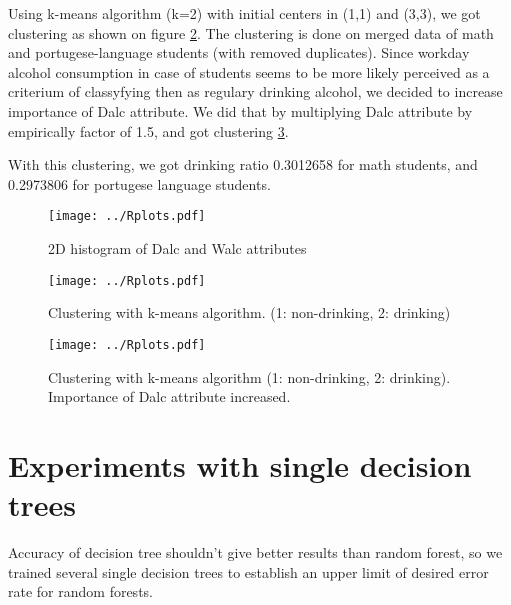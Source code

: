 \documentclass[a4paper]{article}
\begin{document}
\begin{multicols}{2}
Using k-means algorithm (k=2) with initial centers in (1,1) and (3,3), we got clustering as shown on figure \ref{fig:clust}.
The clustering is done on merged data of math and portugese-language students (with removed duplicates).
Since workday alcohol consumption in case of students seems
to be more likely perceived as a criterium of classyfying then as
regulary drinking alcohol,
we decided to increase importance of Dalc attribute.
We did that by multiplying Dalc attribute by empirically factor of 1.5, and got clustering \ref{fig:clust2}.

With this clustering, we got drinking ratio 0.3012658 for math students,
and 0.2973806 for portugese language students.




\begin{figure}[H]
    \caption[]{2D histogram of Dalc and Walc attributes}
    \centering
    \texttt{[image: ../Rplots.pdf]}
    \label{fig:hist2D}
\end{figure}

\begin{figure}[H]
    \caption[]{Clustering with k-means algorithm. (1: non-drinking, 2: drinking)}
    \centering
    \texttt{[image: ../Rplots.pdf]}
    \label{fig:clust}
\end{figure}

\begin{figure}[H]
    \caption[]{Clustering with k-means algorithm (1: non-drinking, 2: drinking). Importance of Dalc attribute increased.}
    \centering
    \texttt{[image: ../Rplots.pdf]}
    \label{fig:clust2}
\end{figure}


\section{Experiments with single decision trees}
\label{expSingle}

Accuracy of decision tree shouldn't give better results than random forest,
so we trained several single decision trees to establish
an upper limit of desired error rate for random forests.


\end{multicols}
\end{document}
